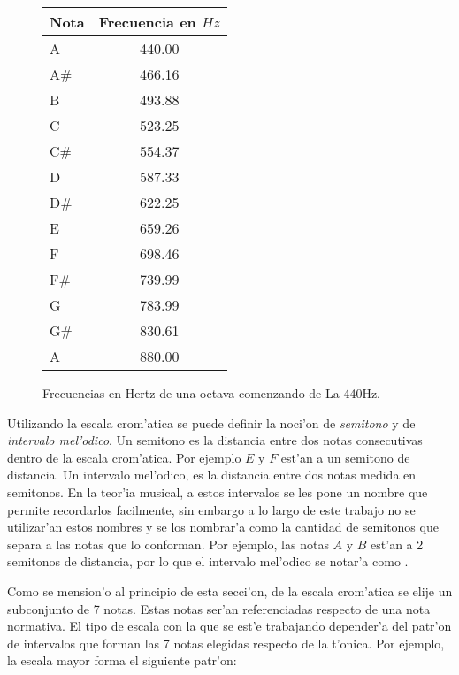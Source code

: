\begin{figure}
\begin{center}
    \begin{tabular}[c]{|l|c|}
    \hline
    \textbf{Nota} & \textbf{Frecuencia en $Hz$} \\
    \hline 
    A		&	440.00 \\
    A\#		&	466.16 \\
    B		&	493.88 \\
    C		&	523.25 \\
    C\#		&	554.37 \\
    D		&	587.33 \\
    D\#		&	622.25 \\
    E		&	659.26 \\
    F		&	698.46 \\
    F\#		&	739.99 \\
    G		&	783.99 \\
    G\#		&	830.61 \\
    A		&	880.00 \\ 
    \hline
    \end{tabular}
 \caption{Frecuencias en Hertz de una octava comenzando de La 440Hz.}
 \label{tab:cromatica}
\end{center}
\end{figure}


Utilizando la escala crom'atica se puede definir la noci'on de \emph{semitono} y de \emph{intervalo mel'odico}. Un semitono es la distancia
entre dos notas consecutivas dentro de la escala crom'atica. Por ejemplo $E$ y $F$ est'an a un semitono de distancia. Un intervalo mel'odico, 
es la distancia entre dos notas medida en semitonos. En la teor'ia musical, a estos intervalos se les pone un nombre que permite recordarlos 
facilmente, sin embargo a lo largo de este trabajo no se utilizar'an estos nombres y se los nombrar'a como la cantidad de semitonos que separa
a las notas que lo conforman. Por ejemplo, las notas $A$ y $B$ est'an a 2 semitonos de distancia, por lo que el intervalo mel'odico
se notar'a como . 

Como se mension'o al principio de esta secci'on, de la escala crom'atica se elije un subconjunto de 7 notas. Estas notas ser'an referenciadas
respecto de una nota normativa. El tipo de escala con la que se est'e trabajando depender'a del patr'on de intervalos que forman las 7 notas elegidas
respecto de la t'onica. Por ejemplo, la escala mayor forma el siguiente patr'on:

\begin{center}
      
\end{center}

